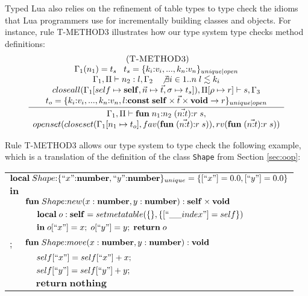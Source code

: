 Typed Lua also relies on the refinement of table types to type check
the idioms that Lua programmers use for incrementally building
classes and objects.
For instance, rule \textsc{T-METHOD3} illustrates how our type system
type checks method definitions:
\[
\begin{array}{c}
\; (\textsc{T-METHOD3})\\
\dfrac{\begin{array}{c}
       \Gamma_{1}(n_{1}) = t_{s} \;\;\; t_{s} = \{k_{i}{:}v_{i}, ..., k_{n}{:}v_{n}\}_{unique|open}\\
       \Gamma_{1}, \Pi \vdash n_{2} : l, \Gamma_{2} \;\;\;
       \not \exists i \in 1..n \; l \lesssim k_{i}\\
       closeall(\Gamma_{1}[self \mapsto \mathbf{self}, \vec{n} \mapsto \vec{t}, \sigma \mapsto t_{s}]),
       \Pi[\rho \mapsto r] \vdash s, \Gamma_{3}\\
       t_{o} = \{k_{i}{:}v_{i}, ..., k_{n}{:}v_{n}, l{:}\mathbf{const} \; \mathbf{self} \times \vec{t} \times \mathbf{void} \rightarrow r\}_{unique|open}
       \end{array}}
      {\begin{array}{c}
       \Gamma_{1}, \Pi \vdash \mathbf{fun} \; n_{1}{:}n_{2} \; (\vec{n{:}t}){:}r \; s,\\
       openset(closeset(\Gamma_{1}[n_{1} \mapsto t_{o}], fav(\mathbf{fun} \; (\vec{n{:}t}){:}r \; s)),rv(\mathbf{fun} \; (\vec{n{:}t}){:}r \; s))
       \end{array}}
\end{array}
\]

Rule \textsc{T-METHOD3} allows our type system to type check the
following example, which is a translation of the definition of the class
\texttt{Shape} from Section \ref{sec:oop}:
\begin{center}
\begin{tabular}{llll}
\multicolumn{4}{l}{$\mathbf{local} \; Shape{:}\{``x"{:}\mathbf{number}, ``y"{:}\mathbf{number}\}_{unique} = \{ [``x"] = 0.0, [``y"] = 0.0 \}$}\\
\multicolumn{4}{l}{$\mathbf{in}$}\\
& \multicolumn{3}{l}{$\mathbf{fun} \; Shape{:}new (x:\mathbf{number}, y:\mathbf{number}):\mathbf{self} \times \mathbf{void}$}\\
& & \multicolumn{2}{l}{$\mathbf{local} \; o:\Self = setmetatable(\{\}, \{ [``\string_\string_index"] = self \})$}\\
& & \multicolumn{2}{l}{$\mathbf{in} \; o[``x"] = x; \; o[``y"] = y; \; \mathbf{return} \; o$}\\
; & \multicolumn{3}{l}{$\mathbf{fun} \; Shape{:}move (x:\mathbf{number}, y:\mathbf{number}):\mathbf{void}$}\\
& & \multicolumn{2}{l}{$self[``x"] = self[``x"] + x;$}\\
& & \multicolumn{2}{l}{$self[``y"] = self[``y"] + y;$}\\
& & \multicolumn{2}{l}{$\mathbf{return} \; \mathbf{nothing}$}
\end{tabular}
\end{center}

